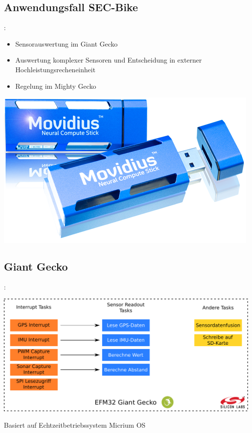\documentclass{beamer}
\begin{document}
\subsection{Anwendungsfall SEC-Bike}
\begin{frame}{\insertsection: \insertsubsection}
\begin{minipage}{0.45\linewidth}
	\begin{itemize}
		\item Sensorauswertung im Giant Gecko
		\item Auswertung komplexer Sensoren und Entscheidung in externer Hochleistungsrecheneinheit
		\item Regelung im Mighty Gecko
	\end{itemize}
\end{minipage} \quad
\begin{minipage}{0.45\linewidth}
	\includegraphics[width=\linewidth]{movidius}
\end{minipage}
\end{frame}

\subsection{Giant Gecko}
\begin{frame}{\insertsection: \insertsubsection}
	\begin{center}
		\includegraphics[width=0.9\linewidth]{gg_software_architecture}
	\end{center}
	
	Basiert auf Echtzeitbetriebssystem Micrium OS
\end{frame}
\end{document}
